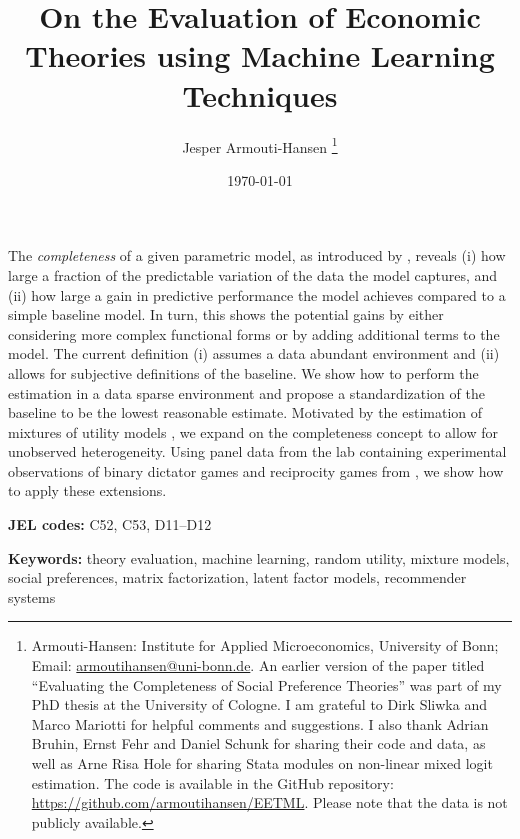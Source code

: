 \documentclass[letterpaper,11pt,leqno]{article}
\begin{document}
\title{On the Evaluation of Economic Theories using Machine Learning Techniques}

\author{Jesper Armouti-Hansen
%
\thanks{Armouti-Hansen: Institute for Applied Microeconomics, University of Bonn; Email: \href{mailto:armoutihansen@uni-bonn.de}{armoutihansen@uni-bonn.de}. An earlier version of the paper titled ``Evaluating the Completeness of Social Preference Theories'' was part of my PhD thesis at the University of Cologne. I am grateful to Dirk Sliwka and Marco Mariotti for helpful comments and suggestions. I also thank Adrian Bruhin, Ernst Fehr and Daniel Schunk for sharing their code and data, as well as Arne Risa Hole for sharing Stata modules on non-linear mixed logit estimation. The code is available in the GitHub repository: \href{https://github.com/armoutihansen/EETML}{https://github.com/armoutihansen/EETML}. Please note that the data is not publicly available.}}

\date{\today}   


\begin{titlepage}
\maketitle

The \emph{completeness} of a given parametric model, as introduced by \citet{Fudenberg2022}, reveals (i) how large a fraction of the predictable variation of the data the model captures, and (ii) how large a gain in predictive performance the model achieves compared to a simple baseline model. In turn, this shows the potential gains by either considering more complex functional forms or by adding additional terms to the model. The current definition (i) assumes a data abundant environment and (ii) allows for subjective definitions of the baseline. We show how to perform the estimation in a data sparse environment and propose a standardization of the baseline to be the lowest reasonable estimate. Motivated by the estimation of mixtures of utility models \citep[See e.g.,][]{Bruhin2010}, we expand on the completeness concept to allow for unobserved heterogeneity. Using panel data from the lab containing experimental observations of binary dictator games and reciprocity games from \citet{Bruhin2019}, we show how to apply these extensions.

\textbf{JEL codes:} C52, C53, D11--D12

\textbf{Keywords:} theory evaluation, machine learning, random utility, mixture models, social preferences, matrix factorization, latent factor models, recommender systems

\end{titlepage}
\end{document}
